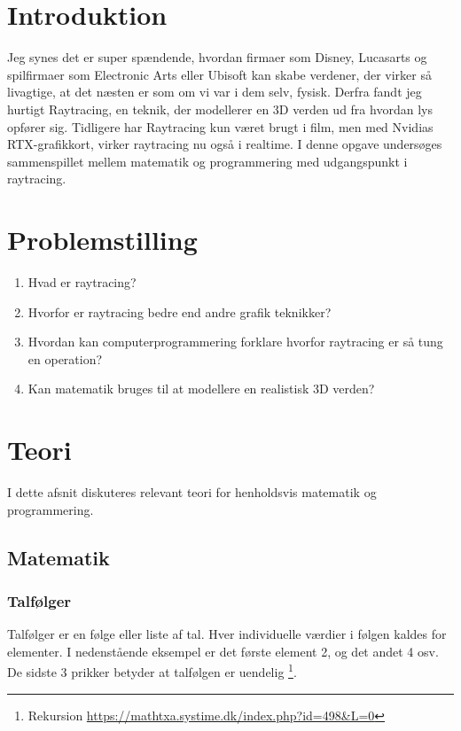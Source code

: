 \documentclass{article}
\begin{document}
\begin{flushleft}
    \section{Introduktion}

    Jeg synes det er super spændende, hvordan firmaer som Disney, Lucasarts og
    spilfirmaer som Electronic Arts eller Ubisoft kan skabe verdener, der virker så livagtige,
    at det næsten er som om vi var i dem selv, fysisk. Derfra fandt jeg hurtigt Raytracing,
    en teknik, der modellerer en 3D verden ud fra hvordan lys opfører sig.
    Tidligere har Raytracing kun været brugt i film, men med Nvidias RTX-grafikkort,
    virker raytracing nu også i realtime.
    I denne opgave undersøges sammenspillet mellem matematik og programmering med udgangspunkt i raytracing.

    \section{Problemstilling}

    \begin{enumerate}
        \item Hvad er raytracing?
        \item Hvorfor er raytracing bedre end andre grafik teknikker?
        \item Hvordan kan computerprogrammering forklare hvorfor raytracing er så tung en operation?
        \item Kan matematik bruges til at modellere en realistisk 3D verden?
    \end{enumerate}

    \section{Teori}

    I dette afsnit diskuteres relevant teori for henholdsvis matematik og programmering.

    \subsection{Matematik}

    \subsubsection{Talfølger}

    Talfølger er en følge eller liste af tal. Hver individuelle værdier i følgen kaldes for elementer.
    I nedenstående eksempel er det første element 2, og det andet 4 osv. De sidste 3 prikker betyder at talfølgen er uendelig
    \footnote{Rekursion \url{https://mathtxa.systime.dk/index.php?id=498&L=0}}.


\end{flushleft}
\end{document}
